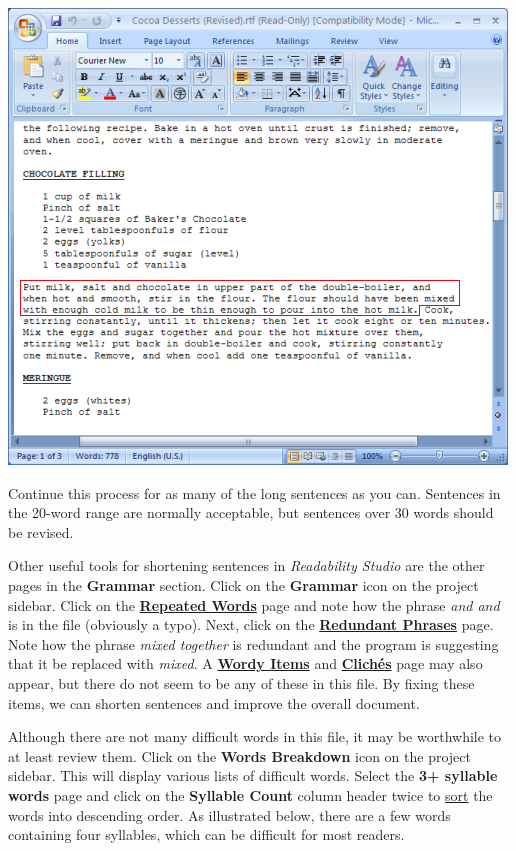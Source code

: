 \documentclass[
]{book}
\theoremstyle{definition}
\theoremstyle{definition}
\theoremstyle{definition}
\theoremstyle{definition}
\theoremstyle{remark}
\begin{document}
\begin{center}\includegraphics[width=0.75\linewidth,]{Images/NonGenerated/improvedsentence} \end{center}

Continue this process for as many of the long sentences as you can. Sentences in the 20-word range are normally acceptable, but sentences over 30 words should be revised.

Other useful tools for shortening sentences in \emph{Readability Studio} are the other pages in the \textbf{Grammar} section. Click on the \textbf{Grammar} icon on the project sidebar. Click on the \protect\hyperlink{reviewing-repeated-words}{\textbf{Repeated Words}} page and note how the phrase \emph{and and} is in the file (obviously a typo). Next, click on the \protect\hyperlink{reviewing-redundant-phrases}{\textbf{Redundant Phrases}} page. Note how the phrase \emph{mixed together} is redundant and the program is suggesting that it be replaced with \emph{mixed}. A \protect\hyperlink{reviewing-wordy-items}{\textbf{Wordy Items}} and \protect\hyperlink{reviewing-cliches}{\textbf{Clichés}} page may also appear, but there do not seem to be any of these in this file. By fixing these items, we can shorten sentences and improve the overall document.

Although there are not many difficult words in this file, it may be worthwhile to at least review them. Click on the \textbf{Words Breakdown} icon on the project sidebar. This will display various lists of difficult words. Select the \textbf{3+ syllable words} page and click on the \textbf{Syllable Count} column header twice to \protect\hyperlink{column-sorting}{sort} the words into descending order. As illustrated below, there are a few words containing four syllables, which can be difficult for most readers.
\end{document}
